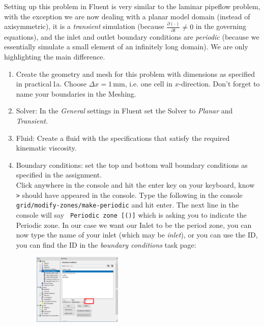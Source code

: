 \documentclass[11pt,a4paper,oneside,hidelinks]{scrartcl}
\begin{document}
Setting up this problem in Fluent is very similar to the laminar pipeflow problem, with the exception we are now dealing with a planar model domain (instead of axisymmetric), it is a \emph{transient} simulation (because $\frac{\partial\left(\cdot\right)}{\partial t}\neq0$ in the governing equations), and the inlet and outlet boundary conditions are \emph{periodic} (because we essentially simulate a small element of an infinitely long domain). We are only highlighting the main difference.

\begin{enumerate}
\item Create the geometry and mesh for this problem with dimensions as specified in practical\,1a. Choose $\Delta x =1$\,mm, i.e. one cell in $x$-direction. Don't forget to name your boundaries in the Meshing.
\item Solver: In the \emph{General} settings in Fluent set the Solver to \emph{Planar} and \emph{Transient}.
\item Fluid: Create a fluid with the specifications that satisfy the required kinematic viscosity.
\item Boundary conditions: set the top and bottom wall boundary conditions as specified in the assignment. \\
    Click anywhere in the console and hit the enter key on your keyboard, know \texttt{>} should have appeared in the console. Type the following in the console \texttt{grid/modify-zones/make-periodic} and hit enter. The next line in the console will say \texttt{
Periodic zone [()]} which is asking you to indicate the Periodic zone. In our case we want our Inlet to be the period zone, you can now type the name of your inlet (which may be \emph{inlet}), or you can use the ID, you can find the ID in the \emph{boundary conditions} task page:
 \begin{figure}[H]
\begin{center}
\includegraphics[width=0.4\textwidth,clip]{BC_ID.png}
\end{center}
\end{figure}


\end{enumerate}
\end{document}
